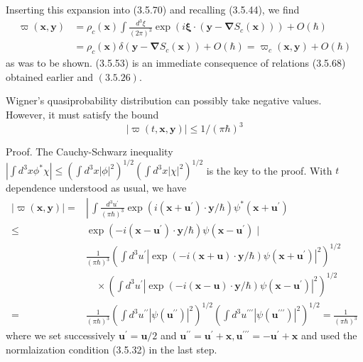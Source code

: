 \documentclass{article}
\begin{document}
Inserting this expansion into (3.5.70) and recalling (3.5.44), we find
$$
\begin{align*}
\varpi(\boldsymbol{x}, \boldsymbol{y}) & =\rho_{c}(\boldsymbol{x}) \int \frac{d^{3} \xi}{(2 \pi)^{3}} \exp \left(i \boldsymbol{\xi} \cdot\left(\boldsymbol{y}-\boldsymbol{\nabla} S_{c}(\boldsymbol{x})\right)\right)+O(\hbar)  \tag{3.5.75}\\
& =\rho_{c}(\boldsymbol{x}) \delta\left(\boldsymbol{y}-\boldsymbol{\nabla} S_{c}(\boldsymbol{x})\right)+O(\hbar)=\varpi_{c}(\boldsymbol{x}, \boldsymbol{y})+O(\hbar)
\end{align*}
$$
as was to be shown.
(3.5.53) is an immediate consequence of relations (3.5.68) obtained earlier and $(3.5 .26)$.

Wigner's quasiprobability distribution can possibly take negative values. However, it must satisfy the bound
$$
\begin{equation*}
|\varpi(t, \boldsymbol{x}, \boldsymbol{y})| \leq 1 /(\pi \hbar)^{3} \tag{3.5.76}
\end{equation*}
$$

Proof. The Cauchy-Schwarz inequality $\left|\int d^{3} x \phi^{*} \chi\right| \leq\left(\int d^{3} x|\phi|^{2}\right)^{1 / 2}\left(\int d^{3} x|\chi|^{2}\right)^{1 / 2}$ is the key to the proof. With $t$ dependence understood as usual, we have
$$
\begin{align*}
|\varpi(\boldsymbol{x}, \boldsymbol{y})|= & \left\lvert\, \int \frac{d^{3} u^{\prime}}{(\pi \hbar)^{3}} \exp \left(i\left(\boldsymbol{x}+\boldsymbol{u}^{\prime}\right) \cdot \boldsymbol{y} / \hbar\right) \psi^{*}\left(\boldsymbol{x}+\boldsymbol{u}^{\prime}\right)\right.  \tag{3.5.77}\\
\leq & \exp \left(-i\left(\boldsymbol{x}-\boldsymbol{u}^{\prime}\right) \cdot \boldsymbol{y} / \hbar\right) \psi\left(\boldsymbol{x}-\boldsymbol{u}^{\prime}\right) \mid \\
& \frac{1}{(\pi \hbar)^{3}}\left(\int d^{3} u^{\prime}\left|\exp (-i(\boldsymbol{x}+\boldsymbol{u}) \cdot \boldsymbol{y} / \hbar) \psi\left(\boldsymbol{x}+\boldsymbol{u}^{\prime}\right)\right|^{2}\right)^{1 / 2} \\
& \quad \times\left(\int d^{3} u^{\prime}\left|\exp (-i(\boldsymbol{x}-\boldsymbol{u}) \cdot \boldsymbol{y} / \hbar) \psi\left(\boldsymbol{x}-\boldsymbol{u}^{\prime}\right)\right|^{2}\right)^{1 / 2} \\
= & \frac{1}{(\pi \hbar)^{3}}\left(\int d^{3} u^{\prime \prime}\left|\psi\left(\boldsymbol{u}^{\prime \prime}\right)\right|^{2}\right)^{1 / 2}\left(\int d^{3} u^{\prime \prime \prime}\left|\psi\left(\boldsymbol{u}^{\prime \prime \prime}\right)\right|^{2}\right)^{1 / 2}=\frac{1}{(\pi \hbar)^{3}}
\end{align*}
$$
where we set successively $\boldsymbol{u}^{\prime}=\boldsymbol{u} / 2$ and $\boldsymbol{u}^{\prime \prime}=\boldsymbol{u}^{\prime}+\boldsymbol{x}, \boldsymbol{u}^{\prime \prime \prime}=-\boldsymbol{u}^{\prime}+\boldsymbol{x}$ and used the normlaization condition (3.5.32) in the last step.
\end{document}
